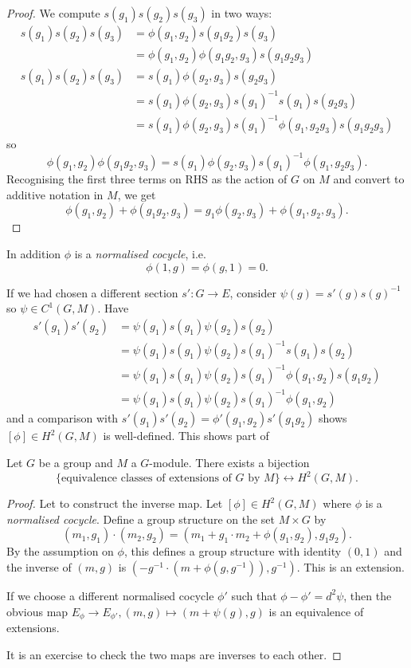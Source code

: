 \documentclass[a4paper]{article}
\begin{document}
\begin{proof}
  We compute \(s(g_1)s(g_2)s(g_3)\) in two ways:
  \begin{align*}
    s(g_1)s(g_2)s(g_3)
    &= \phi(g_1, g_2) s(g_1g_2) s(g_3) \\
    &= \phi(g_1, g_2) \phi(g_1g_2, g_3) s(g_1g_2g_3)\\
    s(g_1)s(g_2)s(g_3)
    &= s(g_1) \phi(g_2, g_3) s(g_2g_3) \\
    &= s(g_1) \phi(g_2, g_3) s(g_1)^{-1} s(g_1) s(g_2g_3) \\
    &= s(g_1) \phi(g_2, g_3) s(g_1)^{-1} \phi(g_1, g_2g_3) s(g_1g_2g_3)
  \end{align*}
  so
  \[
    \phi(g_1, g_2) \phi(g_1g_2, g_3) = s(g_1) \phi(g_2, g_3) s(g_1)^{-1} \phi(g_1, g_2g_3).
  \]
  Recognising the first three terms on RHS as the action of \(G\) on \(M\) and convert to additive notation in \(M\), we get
  \[
    \phi(g_1, g_2) + \phi(g_1g_2, g_3) = g_1 \phi(g_2, g_3) + \phi(g_1, g_2, g_3).
  \]
\end{proof}

In addition \(\phi\) is a \emph{normalised cocycle}, i.e.
\[
  \phi(1, g) = \phi(g, 1) = 0.
\]

If we had chosen a different section \(s': G \to E\), consider \(\psi(g) = s'(g) s(g)^{-1}\) so \(\psi \in C^1(G, M)\). Have
\begin{align*}
  s'(g_1)s'(g_2)
  &= \psi(g_1)s(g_1) \psi(g_2)s(g_2) \\
  &= \psi(g_1)s(g_1) \psi(g_2)s(g_1)^{-1} s(g_1)s(g_2) \\
  &= \psi(g_1)s(g_1)\psi(g_2)s(g_1)^{-1} \phi(g_1, g_2) s(g_1g_2) \\
  &= \psi(g_1)s(g_1)\psi(g_2)s(g_1)^{-1} \phi(g_1, g_2)
\end{align*}
and a comparison with \(s'(g_1)s'(g_2) = \phi'(g_1, g_2)s'(g_1g_2)\) shows \([\phi] \in H^2(G, M)\) is well-defined. This shows part of

\begin{theorem}
  Let \(G\) be a group and \(M\) a \(G\)-module. There exists a bijection
  \[
    \{\text{equivalence classes of extensions of \(G\) by \(M\)}\} \longleftrightarrow H^2(G, M).
  \]
\end{theorem}

\begin{proof}
  Let to construct the inverse map. Let \([\phi] \in H^2(G, M)\) where \(\phi\) is a \emph{normalised cocycle}. Define a group structure on the set \(M \times G\) by
  \[
    (m_1, g_1) \cdot (m_2, g_2) = (m_1 + g_1 \cdot m_2 + \phi(g_1, g_2), g_1g_2).
  \]
  By the assumption on \(\phi\), this defines a group structure with identity \((0, 1)\) and the inverse of \((m, g)\) is \((-g^{-1} \cdot (m + \phi(g, g^{-1})), g^{-1})\). This is an extension.

  If we choose a different normalised cocycle \(\phi'\) such that \(\phi - \phi' = d^2 \psi\), then the obvious map \(E_\phi \to E_{\phi'}, (m, g) \mapsto (m + \psi(g), g)\) is an equivalence of extensions.

  It is an exercise to check the two maps are inverses to each other.
\end{proof}
\end{document}
